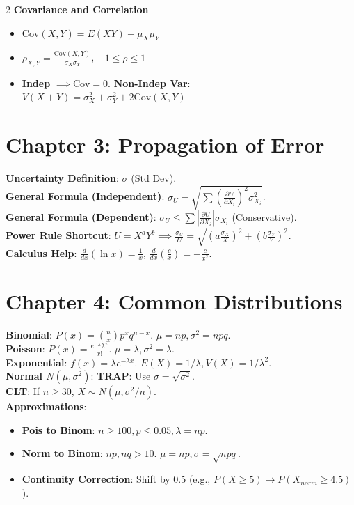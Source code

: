 \documentclass[10pt]{article}
\begin{document}
\begin{multicols}{2}
\textbf{Covariance and Correlation}
\begin{itemize}
    \item $\text{Cov}(X,Y) = E(XY) - \mu_X\mu_Y$
    \item $\rho_{X,Y} = \frac{\text{Cov}(X,Y)}{\sigma_X\sigma_Y}$, $-1 \leq \rho \leq 1$
    \item \textbf{Indep} $\implies \text{Cov}=0$. \textbf{Non-Indep Var}: $V(X+Y) = \sigma_X^2 + \sigma_Y^2 + 2\text{Cov}(X,Y)$
\end{itemize}

\section*{Chapter 3: Propagation of Error}
\textbf{Uncertainty Definition}: $\sigma$ (Std Dev). \\
\textbf{General Formula (Independent)}: $\sigma_U = \sqrt{\sum (\frac{\partial U}{\partial X_i})^2 \sigma_{X_i}^2}$. \\
\textbf{General Formula (Dependent)}: $\sigma_U \leq \sum |\frac{\partial U}{\partial X_i}| \sigma_{X_i}$ (Conservative). \\
\textbf{Power Rule Shortcut}: $U = X^a Y^b \implies \frac{\sigma_U}{U} = \sqrt{(a\frac{\sigma_X}{X})^2 + (b\frac{\sigma_Y}{Y})^2}$. \\
\textbf{Calculus Help}: $\frac{d}{dx}(\ln x) = \frac{1}{x}$, $\frac{d}{dx}(\frac{c}{x}) = -\frac{c}{x^2}$.

\columnbreak

\section*{Chapter 4: Common Distributions}
\textbf{Binomial}: $P(x) = \binom{n}{x}p^x q^{n-x}$. $\mu=np, \sigma^2=npq$. \\
\textbf{Poisson}: $P(x) = \frac{e^{-\lambda}\lambda^x}{x!}$. $\mu=\lambda, \sigma^2=\lambda$. \\
\textbf{Exponential}: $f(x) = \lambda e^{-\lambda x}$. $E(X)=1/\lambda, V(X)=1/\lambda^2$. \\
\textbf{Normal $N(\mu, \sigma^2)$}: \textbf{TRAP}: Use $\sigma = \sqrt{\sigma^2}$. \\
\textbf{CLT}: If $n \geq 30$, $\bar{X} \sim N(\mu, \sigma^2/n)$. \\
\textbf{Approximations}:
\begin{itemize}
    \item \textbf{Pois to Binom}: $n \ge 100, p \le 0.05, \lambda=np$.
    \item \textbf{Norm to Binom}: $np, nq > 10$. $\mu=np, \sigma = \sqrt{npq}$.
    \item \textbf{Continuity Correction}: Shift by 0.5 (e.g., $P(X \ge 5) \to P(X_{norm} \ge 4.5)$).
\end{itemize}


\end{multicols}
\end{document}
